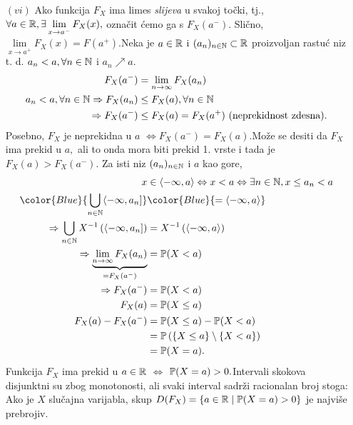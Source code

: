 \documentclass{article}
\begin{document}
\begin{itemize}
    \item[\((vi)\)] Ako funkcija \(F_X\) ima limes \textit{slijeva} u svakoj točki, tj., \(\forall a\in\Bbb R,\exists\lim\limits_{x\to a^-}F_X(x),\) označit ćemo ga s \(F_X(a^-).\) Slično, \(\lim\limits_{x\to a^+}F_X(x)=F(a^+).\)\newline Neka je \(a\in\Bbb R\) i \((a_n)_{n\in\Bbb N}\subset\Bbb R\) proizvoljan rastuć niz t. d. \(a_n<a,\forall n\in\Bbb N\) i \(a_n\nearrow a.\) \[\begin{aligned}F_X(a^-)&=\lim_{n\to\infty}F_X(a_n)\\a_n<a,\forall n\in\Bbb N\Rightarrow F_X(a_n)&\le F_X(a),\forall n\in\Bbb N\\\Rightarrow F_X(a^-)&\le F_X(a)=F_X(a^+)\text{ (neprekidnost zdesna)}.\end{aligned}\] Posebno, \(F_X\) je neprekidna u \(a\) \(\Leftrightarrow F_X(a^-)=F_X(a).\)\newline Može se desiti da \(F_X\) ima prekid u \(a,\) ali to onda mora biti prekid 1. vrste i tada je \(F_X(a)>F_X(a^-).\) Za isti niz \((a_n)_{n\in\Bbb N}\) i \(a\) kao gore, \[\begin{aligned}x&\in\langle-\infty,a\rangle \Leftrightarrow x<a\Leftrightarrow \exists n\in\Bbb N, x\le a_n<a\\{\color{Blue}{\bigcup_{n\in\Bbb N}\langle-\infty,a_n]}}&{\color{Blue}{=\langle-\infty,a\rangle}}\\\Rightarrow\bigcup_{n\in\Bbb N}X^{-1}\left(\langle-\infty,a_n]\right)&=X^{-1}\left(\langle-\infty,a\rangle\right)\\\Rightarrow\underbrace{\lim_{n\to\infty}F_X(a_n)}_{=F_X(a^-)}&=\Bbb P(X<a)\\\Rightarrow F_X(a^-)&=\Bbb P(X<a)\\F_X(a)&=\Bbb P(X\le a)\\ F_X(a)-F_X(a^-)&=\Bbb P(X\le a)-\Bbb P(X<a)\\&=\Bbb P\left(\{X\le a\}\setminus\{X<a\}\right)\\&=\Bbb P(X=a).\end{aligned}\] Funkcija \(F_X\) ima prekid u \(a\in\Bbb R\) \(\Leftrightarrow\) \(\Bbb P(X=a)>0.\)\newline Intervali skokova disjunktni su zbog monotonosti, ali svaki interval sadrži racionalan broj stoga: Ako je \(X\) slučajna varijabla, skup \(D(F_X)=\left\{a\in\Bbb R\mid\Bbb P(X=a)>0\right\}\) je najviše prebrojiv. 
\end{itemize}
\newpage
\end{document}

